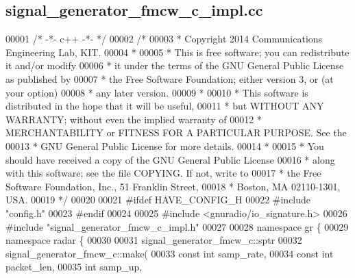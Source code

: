 \subsection{signal\+\_\+generator\+\_\+fmcw\+\_\+c\+\_\+impl.\+cc}
\label{signal__generator__fmcw__c__impl_8cc_source}

\begin{DoxyCode}
00001 \textcolor{comment}{/* -*- c++ -*- */}
00002 \textcolor{comment}{/*}
00003 \textcolor{comment}{ * Copyright 2014 Communications Engineering Lab, KIT.}
00004 \textcolor{comment}{ *}
00005 \textcolor{comment}{ * This is free software; you can redistribute it and/or modify}
00006 \textcolor{comment}{ * it under the terms of the GNU General Public License as published by}
00007 \textcolor{comment}{ * the Free Software Foundation; either version 3, or (at your option)}
00008 \textcolor{comment}{ * any later version.}
00009 \textcolor{comment}{ *}
00010 \textcolor{comment}{ * This software is distributed in the hope that it will be useful,}
00011 \textcolor{comment}{ * but WITHOUT ANY WARRANTY; without even the implied warranty of}
00012 \textcolor{comment}{ * MERCHANTABILITY or FITNESS FOR A PARTICULAR PURPOSE.  See the}
00013 \textcolor{comment}{ * GNU General Public License for more details.}
00014 \textcolor{comment}{ *}
00015 \textcolor{comment}{ * You should have received a copy of the GNU General Public License}
00016 \textcolor{comment}{ * along with this software; see the file COPYING.  If not, write to}
00017 \textcolor{comment}{ * the Free Software Foundation, Inc., 51 Franklin Street,}
00018 \textcolor{comment}{ * Boston, MA 02110-1301, USA.}
00019 \textcolor{comment}{ */}
00020 
00021 \textcolor{preprocessor}{#ifdef HAVE\_CONFIG\_H}
00022 \textcolor{preprocessor}{#include "config.h"}
00023 \textcolor{preprocessor}{#endif}
00024 
00025 \textcolor{preprocessor}{#include <gnuradio/io\_signature.h>}
00026 \textcolor{preprocessor}{#include "signal_generator_fmcw_c_impl.h"}
00027 
00028 \textcolor{keyword}{namespace }gr \{
00029   \textcolor{keyword}{namespace }radar \{
00030 
00031     signal_generator_fmcw_c::sptr
00032     signal_generator_fmcw_c::make(
00033             \textcolor{keyword}{const} \textcolor{keywordtype}{int} samp_rate,
00034             \textcolor{keyword}{const} \textcolor{keywordtype}{int} packet\_len,
00035             \textcolor{keywordtype}{int} samp_up,

\end{DoxyCode}
